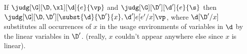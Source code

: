 \begin{lemma}
  If $\judg[\G][\D,\xl][\d]{e}{\vp}$ and $\judg[\G][\D'][\d']{e}{\s}$
  then $\judg[\G][\D,\D'][\subst{\d}{\D'}{x}, \d']{e[e'/x]}{\vp}$,
  where $\d[\D'/x]$ substitutes all occurrences of $x$ in the usage
  environments of variables in $\d$ by the linear variables in $\D'$.
  (really, $x$ couldn't appear anywhere else since $x$ is linear).
\end{lemma}



